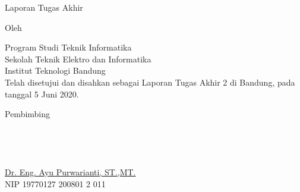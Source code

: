 \clearpage
\pagestyle{empty}

\begin{center}
\smallskip

    \Large \bfseries \MakeUppercase{\thetitle}
    \vfill

    \Large Laporan Tugas Akhir
    \vfill

    \large Oleh

    \Large \theauthor

    \large Program Studi Teknik Informatika \\
    \normalsize \normalfont Sekolah Teknik Elektro dan Informatika \\
    Institut Teknologi Bandung \\

    \vfill
    \normalsize \normalfont
    Telah disetujui dan disahkan sebagai Laporan Tugas Akhir 2 di Bandung, pada tanggal 5 Juni 2020.

    \vfill
    \normalsize \normalfont
    Pembimbing\\
    ~\\
    ~\\
    ~\\
    ~\\
    \underline{Dr. Eng. Ayu Purwarianti, ST.,MT.} \\
    NIP 19770127 200801 2 011


\end{center}
\clearpage
